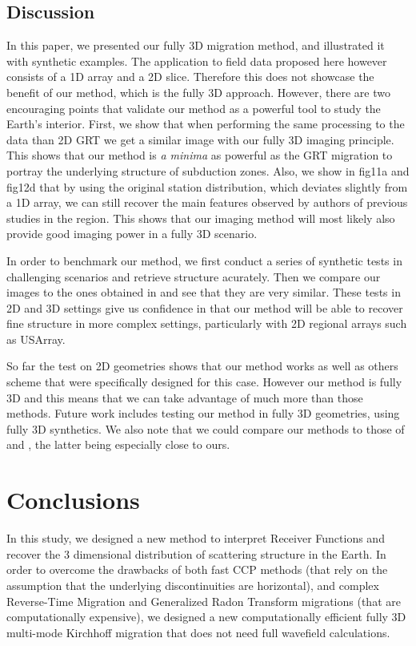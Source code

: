 \documentclass[9pt,a4paper]{article}
\numberwithin{equation}{section}
\begin{document}
\begin{multicols}{2}
\subsection{Discussion}

In this paper, we presented our fully 3D migration method, and illustrated it with synthetic examples.
The application to field data proposed here however consists of a 1D array and a 2D slice.
Therefore this does not showcase the benefit of our method, which is the fully 3D approach.
However, there are two encouraging points that validate our method as a powerful tool to study the Earth’s interior.
First, we show that when performing the same processing to the data than 2D GRT we get a similar image with our fully 3D imaging principle.
This shows that our method is {\textit{a minima}} as powerful as the GRT migration to portray the underlying structure of subduction zones.
Also, we show in fig11a and fig12d that by using the original station distribution, which deviates slightly from a 1D array, we can still recover the main features observed by authors of previous studies in the region.
This shows that our imaging method will most likely also provide good imaging power in a fully 3D scenario.

In order to benchmark our method, we first conduct a series of synthetic tests in challenging scenarios and retrieve structure acurately.
Then we compare our images to the ones obtained in \cite{pear_jgr_12} and see that they are very similar.
These tests in 2D and 3D settings give us confidence in that our method will be able to recover fine structure in more complex settings, particularly with 2D regional arrays such as USArray.

So far the test on 2D geometries shows that our method works as well as others scheme that were specifically designed for this case.
However our method is fully 3D and this means that we can take advantage of much more than those methods.
Future work includes testing our method in fully 3D geometries, using fully 3D synthetics.
We also note that we could compare our methods to those of \cite{pavl_cg_11} and \cite{hans_ggg_17}, the latter being especially close to ours.

\section{Conclusions}

In this study, we designed a new method to interpret Receiver Functions and recover the 3 dimensional distribution of scattering structure in the Earth.
In order to overcome the drawbacks of both fast CCP methods (that rely on the assumption that the underlying discontinuities are horizontal), and complex Reverse-Time Migration and Generalized Radon Transform migrations (that are computationally expensive), we designed a new computationally efficient fully 3D multi-mode Kirchhoff migration that does not need full wavefield calculations.


\end{multicols}
\end{document}
